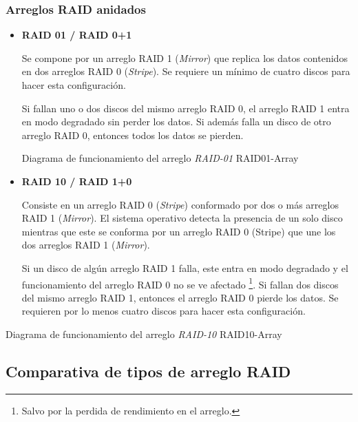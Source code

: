 \subsubsection*{Arreglos RAID anidados}

\begin{itemize}

  \item \textbf{RAID 01 / RAID 0+1}

Se compone por un arreglo \textsc{RAID} 1 (\textit{Mirror}) que replica los datos contenidos en dos arreglos \textsc{RAID} 0 (\textit{Stripe}). Se requiere un m\'{i}nimo de cuatro discos para hacer esta configuraci\'{o}n.

Si fallan uno o dos discos del mismo arreglo \textsc{RAID} 0, el arreglo \textsc{RAID} 1 entra en modo degradado sin perder los datos. Si adem\'{a}s falla un disco de otro arreglo \textsc{RAID} 0, entonces todos los datos se pierden.

\diagramblock
{Diagrama de funcionamiento del arreglo \textit{RAID-01}}
{RAID01-Array}
{
 {
  
 }
}

\newpage
  \item \textbf{RAID 10 / RAID 1+0}

Consiste en un arreglo \textsc{RAID} 0 (\textit{Stripe}) conformado por dos o m\'{a}s arreglos \textsc{RAID} 1 (\textit{Mirror}). El sistema operativo detecta la presencia de un solo disco mientras que este se conforma por un arreglo \textsc{RAID} 0 (Stripe) que une los dos arreglos \textsc{RAID} 1 (\textit{Mirror}).

Si un disco de alg\'{u}n arreglo \textsc{RAID} 1 falla, este entra en modo degradado y el funcionamiento del arreglo \textsc{RAID} 0 no se ve afectado \footnote{Salvo por la perdida de rendimiento en el arreglo.}. Si fallan dos discos del mismo arreglo \textsc{RAID} 1, entonces el arreglo \textsc{RAID} 0 pierde los datos. Se requieren por lo menos cuatro discos para hacer esta configuraci\'{o}n.

\end{itemize}

\diagramblock
{Diagrama de funcionamiento del arreglo \textit{RAID-10}}
{RAID10-Array}
{
 {
  
 }
}

\newpage
      \subsection {Comparativa de tipos de arreglo RAID}

